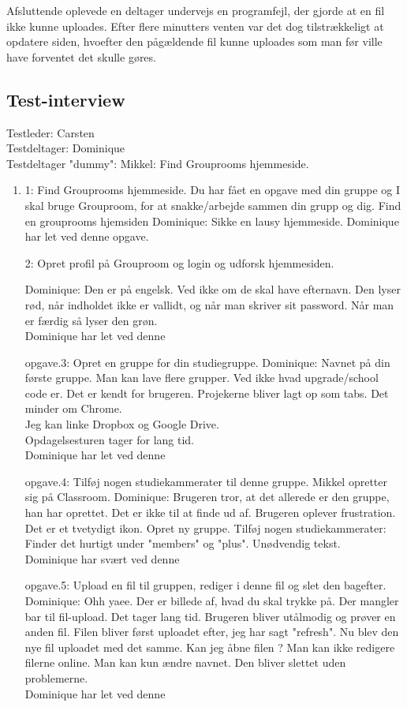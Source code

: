 \documentclass[12pt]{article}
\begin{document}
\noindent Afsluttende oplevede en deltager undervejs en programfejl, der gjorde at en fil ikke kunne uploades. Efter flere minutters venten var det dog tilstrækkeligt at opdatere siden, hvoefter den pågældende fil kunne uploades som man før ville have forventet det skulle gøres.

\subsection*{Test-interview}

Testleder: Carsten\\
Testdeltager: Dominique\\
Testdeltager "dummy": Mikkel: Find Grouprooms hjemmeside.\\
\begin{enumerate}
  \item 1: Find Grouprooms hjemmeside.
Du har f\aa et en opgave med din gruppe og I skal bruge Grouproom, for at snakke/arbejde sammen din grupp og dig. Find en grouprooms hjemsiden
Dominique: Sikke en lausy hjemmeside.
Dominique har let ved denne opgave.

2: Opret profil på Grouproom og login og udforsk hjemmesiden.

Dominique: Den er på engelsk. Ved ikke om de skal have efternavn. Den lyser rød, når indholdet ikke er vallidt, og når man skriver sit password. Når man er færdig så lyser den grøn. \\
Dominique har let ved denne 

opgave.3: Opret en gruppe for din studiegruppe.
Dominique: Navnet på din første gruppe. Man kan lave flere grupper. Ved ikke hvad upgrade/school code er.
Det er kendt for brugeren. Projekerne bliver lagt op som tabs. Det minder om Chrome. \\
Jeg kan linke Dropbox og Google Drive. \\
Opdagelsesturen tager for lang tid.\\
Dominique har let ved denne 

opgave.4: Tilføj nogen studiekammerater til denne gruppe.
Mikkel opretter sig på Classroom.
Dominique: Brugeren tror, at det allerede er den gruppe, han har oprettet.
Det er ikke til at finde ud af. Brugeren oplever frustration.
Det er et tvetydigt ikon. Opret ny gruppe.
Tilføj nogen studiekammerater: Finder det hurtigt under "members" og "plus". Unødvendig tekst.\\
Dominique har svært ved denne 

opgave.5: Upload en fil til gruppen, rediger i denne fil og slet den bagefter.
Dominique: Ohh yaee. Der er billede af, hvad du skal trykke på. Der mangler bar til fil-upload. Det tager lang tid. Brugeren bliver utålmodig og prøver en anden fil.
Filen bliver først uploadet efter, jeg har sagt "refresh".
Nu blev den nye fil uploadet med det samme.
Kan jeg åbne filen ? Man kan ikke redigere filerne online. Man kan kun ændre navnet.
Den bliver slettet uden problemerne.\\
Dominique har let ved denne 


\end{enumerate}
\end{document}
